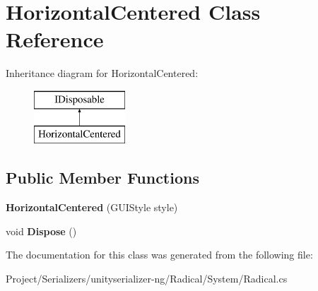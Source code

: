 \hypertarget{class_horizontal_centered}{}\section{Horizontal\+Centered Class Reference}
\label{class_horizontal_centered}
Inheritance diagram for Horizontal\+Centered\+:\begin{figure}[H]
\begin{center}
\leavevmode
\includegraphics[height=2.000000cm]{class_horizontal_centered}
\end{center}
\end{figure}
\subsection*{Public Member Functions}
\begin{DoxyCompactItemize}
\item 
\mbox{\label{class_horizontal_centered_a45e944344beec9d95e42d604bc9b9771}} 
{\bfseries Horizontal\+Centered} (G\+U\+I\+Style style)
\item 
\mbox{\label{class_horizontal_centered_ae1df0c563467fff386f86b1e42115fb8}} 
void {\bfseries Dispose} ()
\end{DoxyCompactItemize}


The documentation for this class was generated from the following file\+:\begin{DoxyCompactItemize}
\item 
Project/\+Serializers/unityserializer-\/ng/\+Radical/\+System/Radical.\+cs\end{DoxyCompactItemize}
